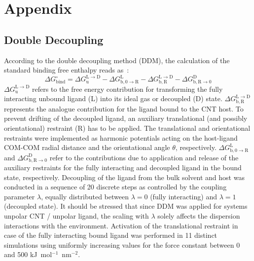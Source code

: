 \documentclass[9pt,lessons]{livecoms}
\begin{document}
\section*{Appendix}

\subsection*{Double Decoupling}

According to the double decoupling method (DDM), 
the calculation of the standard binding free enthalpy reads as~\cite{deng2009computations}:
\begin{equation}
\Delta G^\circ_\mathrm{bind} = \Delta G^\mathrm{L \rightarrow D}_\mathrm{u} - \Delta G^\mathrm{L}_\mathrm{b, 0 \rightarrow R} - \Delta G^\mathrm{L \rightarrow D}_\mathrm{b, R} 
- \Delta G^\mathrm{D}_\mathrm{b, R \rightarrow 0} 
\label{eq:DG0_DDM}
\end{equation}
$\Delta G^\mathrm{L \rightarrow D}_\mathrm{u}$ refers to the free energy contribution for transforming the fully interacting unbound ligand (L) into its ideal gas or decoupled (D) state. 
$\Delta G^\mathrm{L \rightarrow D}_\mathrm{b, R}$ represents the analogue contribution for the ligand bound to the CNT host.
To prevent drifting of the decoupled ligand, an auxiliary translational (and possibly orientational) restraint (R) has to be applied.
The translational and orientational restraints were implemented as harmonic potentials acting on the host-ligand COM-COM radial distance and the orientational angle $\theta$, respectively. 
$\Delta G^\mathrm{L}_\mathrm{b, 0 \rightarrow R}$ and $\Delta G^\mathrm{D}_\mathrm{b, R \rightarrow 0}$ refer to the contributions due to application and release of the auxiliary restraints 
for the fully interacting and decoupled ligand in the bound state, respectively.
Decoupling of the ligand from the bulk solvent and host was conducted in a sequence of 20 discrete steps as controlled by the coupling parameter $\lambda$, equally  distributed between $\lambda = 0$ (fully interacting) 
and $\lambda = 1$ (decoupled state).
It should be stressed that since DDM was applied for systems unpolar CNT / unpolar ligand, the scaling with $\lambda$ solely affects the dispersion interactions with the environment.
Activation of the translational %
restraint in case of the fully interacting bound ligand was performed in 11 distinct simulations using uniformly increasing values for the force constant between 0 and 
500 kJ~mol$^{-1}$~nm$^{-2}$. 
\end{document}
